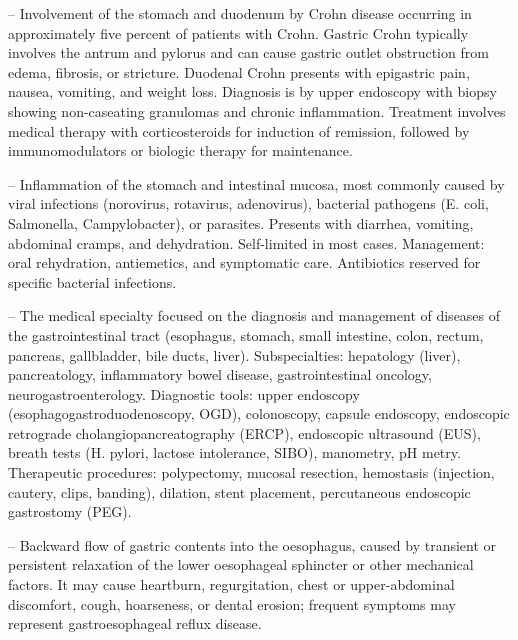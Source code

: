 -- Involvement of the stomach and duodenum by Crohn disease occurring in approximately five percent of patients with Crohn. Gastric Crohn typically involves the antrum and pylorus and can cause gastric outlet obstruction from edema, fibrosis, or stricture. Duodenal Crohn presents with epigastric pain, nausea, vomiting, and weight loss. Diagnosis is by upper endoscopy with biopsy showing non-caseating granulomas and chronic inflammation. Treatment involves medical therapy with corticosteroids for induction of remission, followed by immunomodulators or biologic therapy for maintenance.

-- Inflammation of the stomach and intestinal mucosa, most commonly caused by viral infections (norovirus, rotavirus, adenovirus), bacterial pathogens (E. coli, Salmonella, Campylobacter), or parasites. Presents with diarrhea, vomiting, abdominal cramps, and dehydration. Self-limited in most cases. Management: oral rehydration, antiemetics, and symptomatic care. Antibiotics reserved for specific bacterial infections.

-- The medical specialty focused on the diagnosis and management of diseases of the gastrointestinal tract (esophagus, stomach, small intestine, colon, rectum, pancreas, gallbladder, bile ducts, liver). Subspecialties: hepatology (liver), pancreatology, inflammatory bowel disease, gastrointestinal oncology, neurogastroenterology. Diagnostic tools: upper endoscopy (esophagogastroduodenoscopy, OGD), colonoscopy, capsule endoscopy, endoscopic retrograde cholangiopancreatography (ERCP), endoscopic ultrasound (EUS), breath tests (H. pylori, lactose intolerance, SIBO), manometry, pH metry. Therapeutic procedures: polypectomy, mucosal resection, hemostasis (injection, cautery, clips, banding), dilation, stent placement, percutaneous endoscopic gastrostomy (PEG).

-- Backward flow of gastric contents into the oesophagus, caused by transient or persistent relaxation of the lower oesophageal sphincter or other mechanical factors. It may cause heartburn, regurgitation, chest or upper-abdominal discomfort, cough, hoarseness, or dental erosion; frequent symptoms may represent gastroesophageal reflux disease.

